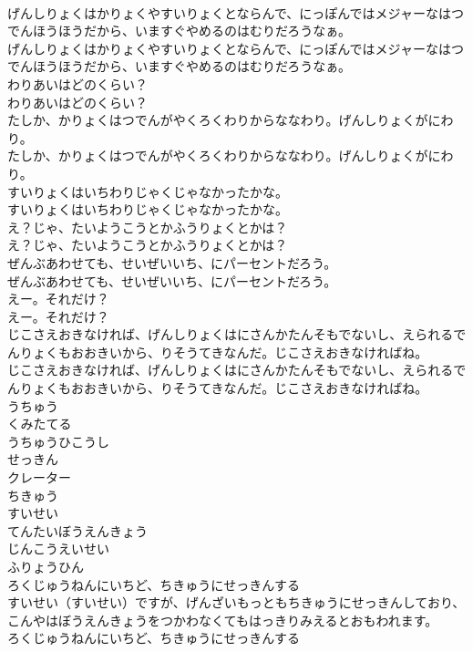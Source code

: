 \documentclass[8pt]{extreport}
\begin{document}
\begin{CJK}{UTF8}{min}
\\	げんしりょくはかりょくやすいりょくとならんで、にっぽんではメジャーなはつでんほうほうだから、いますぐやめるのはむりだろうなぁ。	
\\	げんしりょくはかりょくやすいりょくとならんで、にっぽんではメジャーなはつでんほうほうだから、いますぐやめるのはむりだろうなぁ。 
\\	わりあいはどのくらい？	
\\	わりあいはどのくらい？ 
\\	たしか、かりょくはつでんがやくろくわりからななわり。げんしりょくがにわり。	
\\	たしか、かりょくはつでんがやくろくわりからななわり。げんしりょくがにわり。 
\\	すいりょくはいちわりじゃくじゃなかったかな。	
\\	すいりょくはいちわりじゃくじゃなかったかな。 
\\	え？じゃ、たいようこうとかふうりょくとかは？	
\\	え？じゃ、たいようこうとかふうりょくとかは？ 
\\	ぜんぶあわせても、せいぜいいち、にパーセントだろう。	
\\	ぜんぶあわせても、せいぜいいち、にパーセントだろう。 
\\	えー。それだけ？	
\\	えー。それだけ？ 
\\	じこさえおきなければ、げんしりょくはにさんかたんそもでないし、えられるでんりょくもおおきいから、りそうてきなんだ。じこさえおきなければね。	
\\	じこさえおきなければ、げんしりょくはにさんかたんそもでないし、えられるでんりょくもおおきいから、りそうてきなんだ。じこさえおきなければね。 
\\	うちゅう
\\	くみたてる
\\	うちゅうひこうし
\\	せっきん
\\	クレーター
\\	ちきゅう
\\	すいせい
\\	てんたいぼうえんきょう
\\	じんこうえいせい
\\	ふりょうひん
\\	ろくじゅうねんにいちど、ちきゅうにせっきんする
\\	すいせい（すいせい）ですが、げんざいもっともちきゅうにせっきんしており、こんやはぼうえんきょうをつかわなくてもはっきりみえるとおもわれます。	
\\	ろくじゅうねんにいちど、ちきゅうにせっきんする

\end{CJK}
\end{document}
